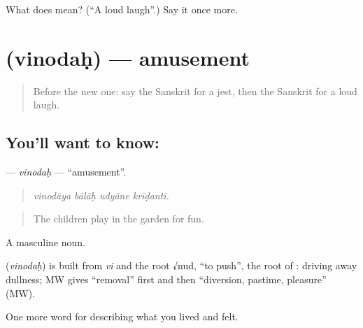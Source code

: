 \begin{tcolorbox}[breakable,colback=teal!4,colframe=teal!35!black,title={Before you move on}]
What does  mean? (\textquotedblleft{}A loud laugh\textquotedblright{}.) Say it once more.
\end{tcolorbox}
\section[\texorpdfstring{\sk{विनोदः} (vinodaḥ)}{विनोदः (vinodaḥ)}]{ (vinodaḥ) — amusement}

\label{lesson:SA-C457-vinodah}



\begin{quote}
Before the new one: say the Sanskrit for a jest, then the Sanskrit for a loud laugh.
\end{quote}

\subsection*{You'll want to know: }
\textbf{} — \emph{vinodaḥ} — \textquotedblleft{}amusement\textquotedblright{}.

\begin{quote}
   
\end{quote}

\begin{quote}
\emph{vinodāya bālāḥ udyāne krīḍanti.}
\end{quote}

\begin{quote}
The children play in the garden for fun.
\end{quote}

A masculine noun.

\begin{cousinweb}
\textbf{} (\emph{vinodaḥ}) is built from \emph{vi} and the root √nud, \textquotedblleft{}to push\textquotedblright{}, the root of \textbf{}: driving away dullness; MW gives \textquotedblleft{}removal\textquotedblright{} first and then \textquotedblleft{}diversion, pastime, pleasure\textquotedblright{} (MW).
\end{cousinweb}

\begin{grammarlens}[title={What you've built}]
One more word for describing what you lived and felt.
\end{grammarlens}

